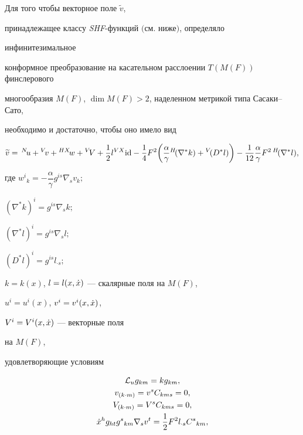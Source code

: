 \begin{thm} Для того чтобы векторное поле $\widetilde{v}$,


принадлежащее классу {\em SHF}-функций $($см. ниже$)$, определяло


инфинитезимальное


конформное преобразование на касательном расслоении $T(M(F))$ финслерового


многообразия $M(F)$, $\dim M(F)>2$, наделенном метрикой типа Сасаки--Сато,


необходимо и достаточно, чтобы оно имело вид


$$


\widetilde{v} =\,{}^{N}\! u +{}^{V}\! v +{}^{HX}\! w +{}^{V}\! V + 


\frac{1}{2}l{}^{VX}{\id} -


\frac{1}{4}F^{2}\biggl(\frac{\alpha}{\gamma}{}^{H}\! (\nabla^*k) + 


{}^{V}\! (D^{*}l)\biggr) - 


\frac{1}{12}\frac{\alpha}{\gamma}F^2\, {}^{H}\! (\nabla^{*}l),


$$


где $w^{i}{}_{k} = 


-\dfrac{\alpha}{\gamma}g^{is}\nabla_{s}v_{k};$


$(\nabla^*k)^{i} = g^{is}\nabla_{s}k;$


$(\nabla^*l)^{i} = g^{is}\nabla_{s}l;$


$(D^{*}l)^{i} = g^{is}l_{\cdot s};$


$k = k(x)$, $l = l(x,\Dot x)$ --- скалярные поля на $M(F)$,


$u^{i} = u^{i}(x)$, $v^{i} = v^{i}(x,\Dot x)$, 


$V^{i} = V^{i}(x,\Dot x)$ --- векторные поля


на $M(F)$,


удовлетворяющие условиям


\begin{gather}




{\lie}_u g_{km} = kg_{km}, \notag \\


v_{(k\cdot m)} = v^{s}C_{kms}= 0, \notag \\


V_{(k\cdot m)} = V^{s}C_{kms}= 0, \notag \\


\xt^{h}g_{ht}g^{s}{}_{km}\nabla_{s}v^{t} = 


\frac{1}{2}F^{2}l_{\cdot s}C^{s}{}_{km}, \notag \\



\end{gather}
\end{thm}

